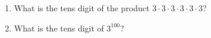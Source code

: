 \begin{enumerate}
\item[(a)] What is the tens digit of the product $3\cdot3\cdot3\cdot3\cdot3\cdot3$?
\item[(b)] What is the tens digit of $3^{100}$?
\end{enumerate}
